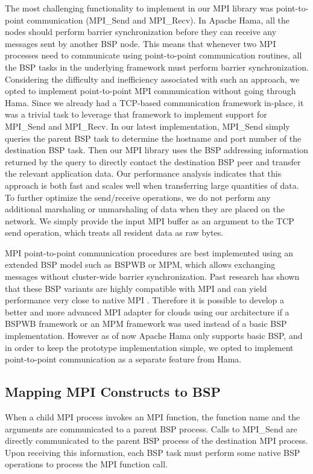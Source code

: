 \documentclass[conference,10pt] {IEEEtran}
\begin{document}
The most challenging functionality to implement in our MPI library was point-to-point communication (MPI\_Send and MPI\_Recv). In Apache Hama, all the nodes should perform barrier synchronization before they can receive any messages sent by another BSP node. This means that whenever two MPI processes need to communicate using point-to-point communication routines, all the BSP tasks in the underlying framework must perform barrier synchronization. Considering the difficulty and inefficiency associated with such an approach, we opted to implement point-to-point MPI communication without going through Hama. Since we already had a TCP-based communication framework in-place, it was a trivial task to leverage that framework to implement support for MPI\_Send and MPI\_Recv. In our latest implementation, MPI\_Send simply queries the parent BSP task to determine the hostname and port number of the destination BSP task. Then our MPI library uses the BSP addressing information returned by the query to directly contact the destination BSP peer and transfer the relevant application data. Our performance analysis indicates that this approach is both fast and scales well when transferring large quantities of data. To further optimize the send/receive operations, we do not perform any additional marshaling or unmarshaling of data when they are placed on the network. We simply provide the input MPI buffer as an argument to the TCP send operation, which treats all resident data as raw bytes.

MPI point-to-point communication procedures are best implemented using an extended BSP model such as BSPWB or MPM, which allows exchanging messages without cluster-wide barrier synchronization. Past research has shown that these BSP variants are highly compatible with MPI and can yield performance very close to native MPI \cite{Roda:1998:BSP:945406.938371}. Therefore it is possible to develop a better and more advanced MPI adapter for clouds using our architecture if a BSPWB framework or an MPM framework was used instead of a basic BSP implementation. However as of now Apache Hama only supports basic BSP, and in order to keep the prototype implementation simple, we opted to implement point-to-point communication as a separate feature from Hama.

\subsection{Mapping MPI Constructs to BSP}
When a child MPI process invokes an MPI function, the function name and the arguments are communicated to a parent BSP process. Calls to MPI\_Send are directly communicated to the parent BSP process of the destination MPI process. Upon receiving this information, each BSP task must perform some native BSP operations to process the MPI function call.
\end{document}

